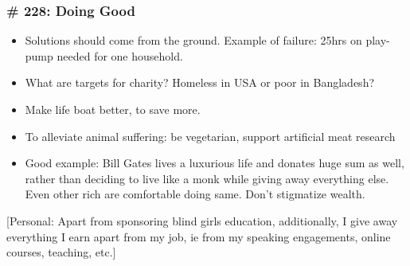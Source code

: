 \begin{frame}[fragile]
\frametitle{\# 228: Doing Good}


\begin{itemize}
\item Solutions should come from the ground. Example of failure: 25hrs on play-pump needed for one household.
\item  What are targets for charity? Homeless in USA or poor in Bangladesh?
\item  Make life boat better, to save more.
\item  To alleviate animal suffering: be vegetarian, support artificial meat research
\item  Good example: Bill Gates lives a luxurious life and donates huge sum as well, rather than deciding to live like a monk while giving away everything else. Even other rich are comfortable doing same. Don't stigmatize wealth.
\end{itemize}


[Personal: Apart from sponsoring blind girls education, additionally, I give away everything I earn apart from my job, ie from my speaking engagements, online courses, teaching, etc.]
\end{frame}



